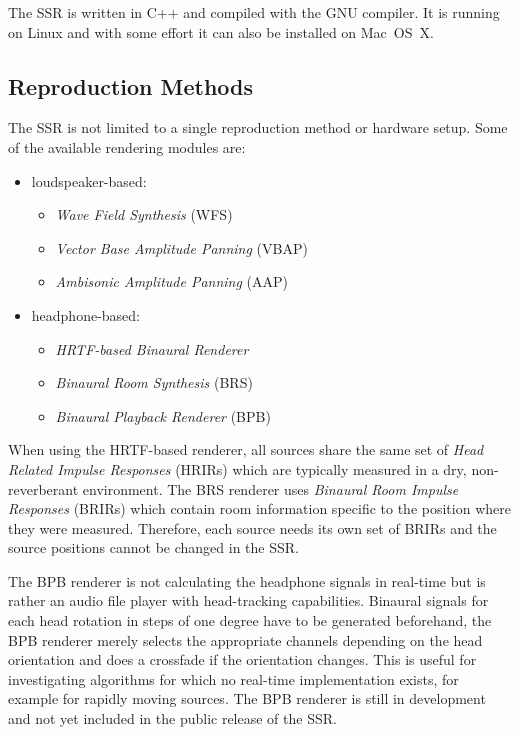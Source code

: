\documentclass[a4paper]{article}
\begin{document}
The SSR is written in C++ and compiled with the GNU compiler.
It is running on Linux and with some effort it can also be installed on
Mac~OS~X.

\subsection{Reproduction Methods}

The SSR is not limited to a single reproduction method or hardware setup.
Some of the available rendering modules are:

\begin{itemize}
\item loudspeaker-based:
\begin{itemize}
\item \emph{Wave Field Synthesis} (WFS)~\cite{Spors2008wfs}
\item \emph{Vector Base Amplitude Panning} (VBAP)~\cite{Pulkki97Virtual}
\item \emph{Ambisonic Amplitude Panning} (AAP)~\cite{Neukom2007}
\end{itemize}
\item headphone-based:
\begin{itemize}
\item \emph{HRTF-based Binaural Renderer}
\item \emph{Binaural Room Synthesis} (BRS)
\item \emph{Binaural Playback Renderer} (BPB)
\end{itemize}
\end{itemize}

\noindent When using the HRTF-based renderer, all sources share the same set of
\emph{Head Related Impulse Responses} (HRIRs) which are typically measured in a
dry, non-reverberant environment.
The BRS renderer uses \emph{Binaural Room Impulse Responses} (BRIRs) which
contain room information specific to the position where they were measured.
Therefore, each source needs its own set of BRIRs and the source positions
cannot be changed in the SSR.

The BPB renderer is not calculating the headphone signals in real-time but is
rather an audio file player with head-tracking capabilities.
Binaural signals for each head rotation in steps of one degree have to be
generated beforehand, the BPB renderer merely selects the appropriate channels
depending on the head orientation and does a crossfade if the orientation
changes.
This is useful for investigating algorithms for which no
real-time implementation exists, for example for rapidly moving sources.
The BPB renderer is still in development and not yet included in the public
release of the SSR.
\end{document}
